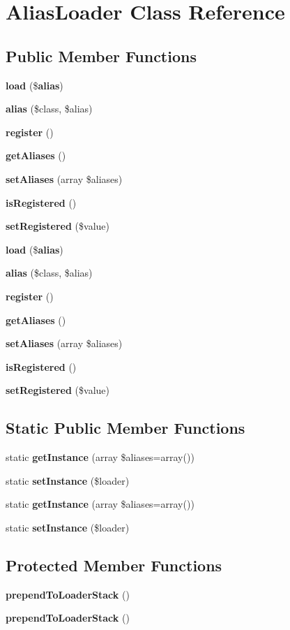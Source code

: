 \section{Alias\+Loader Class Reference}
\label{class_illuminate_1_1_foundation_1_1_alias_loader}
\subsection*{Public Member Functions}
\begin{DoxyCompactItemize}
\item 
{\bf load} (\${\bf alias})
\item 
{\bf alias} (\$class, \$alias)
\item 
{\bf register} ()
\item 
{\bf get\+Aliases} ()
\item 
{\bf set\+Aliases} (array \$aliases)
\item 
{\bf is\+Registered} ()
\item 
{\bf set\+Registered} (\$value)
\item 
{\bf load} (\${\bf alias})
\item 
{\bf alias} (\$class, \$alias)
\item 
{\bf register} ()
\item 
{\bf get\+Aliases} ()
\item 
{\bf set\+Aliases} (array \$aliases)
\item 
{\bf is\+Registered} ()
\item 
{\bf set\+Registered} (\$value)
\end{DoxyCompactItemize}
\subsection*{Static Public Member Functions}
\begin{DoxyCompactItemize}
\item 
static {\bf get\+Instance} (array \$aliases=array())
\item 
static {\bf set\+Instance} (\$loader)
\item 
static {\bf get\+Instance} (array \$aliases=array())
\item 
static {\bf set\+Instance} (\$loader)
\end{DoxyCompactItemize}
\subsection*{Protected Member Functions}
\begin{DoxyCompactItemize}
\item 
{\bf prepend\+To\+Loader\+Stack} ()
\item 
{\bf prepend\+To\+Loader\+Stack} ()
\end{DoxyCompactItemize}
